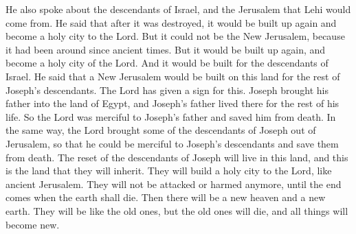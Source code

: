 He also spoke about the descendants of Israel, and the Jerusalem that Lehi would come from. He said that after it was destroyed, it would be built up again and become a holy city to the Lord. But it could not be the New Jerusalem, because it had been around since ancient times. But it would be built up again, and become a holy city of the Lord. And it would be built for the descendants of Israel.
\bverse \iffalse And that a New Jerusalem should be built upon this land, unto the remnant of the seed of Joseph, for which things there has been a type. \fi
He said that a New Jerusalem would be built on this land for the rest of Joseph's descendants. The Lord has given a sign for this.
\bverse \iffalse For as Joseph brought his father down into the land of Egypt, even so he died there; wherefore, the Lord brought a remnant of the seed of Joseph out of the land of Jerusalem, that he might be merciful unto the seed of Joseph that they should perish not, even as he was merciful unto the father of Joseph that he should perish not. \fi
Joseph brought his father into the land of Egypt, and Joseph's father lived there for the rest of his life. So the Lord was merciful to Joseph's father and saved him from death. In the same way, the Lord brought some of the descendants of Joseph out of Jerusalem, so that he could be merciful to Joseph's descendants and save them from death.
\bverse \iffalse Wherefore, the remnant of the house of Joseph shall be built upon this land; and it shall be a land of their inheritance; and they shall build up a holy city unto the Lord, like unto the Jerusalem of old; and they shall no more be confounded, until the end come when the earth shall pass away. \fi
The reset of the descendants of Joseph will live in this land, and this is the land that they will inherit. They will build a holy city to the Lord, like ancient Jerusalem. They will not be attacked or harmed anymore, until the end comes when the earth shall die.
\bverse \iffalse And there shall be a new heaven and a new earth; and they shall be like unto the old save the old have passed away, and all things have become new. \fi
Then there will be a new heaven and a new earth. They will be like the old ones, but the old ones will die, and all things will become new.
\bverse \iffalse And then cometh the New Jerusalem; and blessed are they who dwell therein, for it is they whose garments are white through the blood of the Lamb; and they are they who are numbered among the remnant of the seed of Joseph, who were of the house of Israel. \fi

